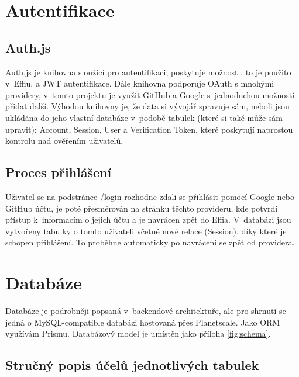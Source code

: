 \documentclass[12pt, a4paper,
openright
]{report}
\begin{document}
\section{Autentifikace}
\subsection{Auth.js}
Auth.js je knihovna sloužící pro autentifikaci, poskytuje možnost , to je použito v~Effiu, a JWT autentifikace. Dále knihovna podporuje OAuth s mnohými providery, v~tomto projektu je využit GitHub a Google s~jednoduchou možností přidat další. Výhodou knihovny je, že data si vývojář spravuje sám, neboli jsou ukládána do jeho vlastní databáze v~podobě tabulek (které si také může sám upravit): Account, Session, User a Verification Token, které poskytují naprostou kontrolu nad ověřením uživatelů.
\clearpage
\subsection{Proces přihlášení}
Uživatel se na podstránce /login rozhodne zdali se přihlásit pomocí Google nebo GitHub účtu, je poté přesměrován na stránku těchto providerů, kde potvrdí přístup k~informacím o jejich účtu a je navrácen zpět do Effia. V~databázi jsou vytvořeny tabulky o tomto uživateli včetně nové relace (Session), díky které je schopen přihlášení. To proběhne automaticky po navrácení se zpět od providera.

\clearpage
\section{Databáze}

Databáze je podrobněji popsaná v~backendové architektuře, ale pro shrnutí se jedná o MySQL-compatible databázi hostovaná přes Planetscale. Jako ORM využívám Prismu. Databázový model je umístěn jako příloha \ref{fig:schema}.

\subsection{Stručný popis účelů jednotlivých tabulek}
\end{document}
